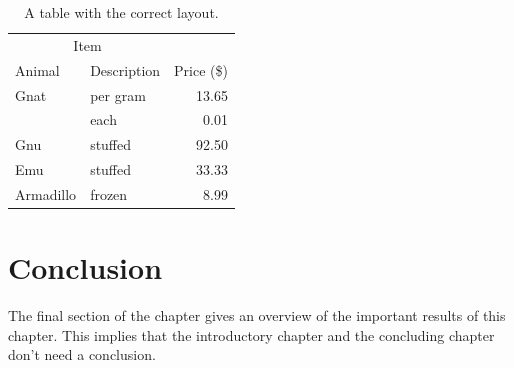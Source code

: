 \begin{table}
	\centering
	\begin{tabular}{@{}llr@{}} \toprule
		\multicolumn{2}{c}{Item} \\ \cmidrule(r){1-2}
		Animal    & Description & Price (\$)\\ \midrule
		Gnat      & per gram    & 13.65 \\
		& each        & 0.01 \\
		Gnu       & stuffed     & 92.50 \\
		Emu       & stuffed     & 33.33 \\
		Armadillo & frozen      & 8.99 \\ \bottomrule
	\end{tabular}
	\caption{A table with the correct layout.}
	\label{tab:ok}
\end{table}


\section{Conclusion}
The final section of the chapter gives an overview of the important results
of this chapter. This implies that the introductory chapter and the
concluding chapter don't need a conclusion.

